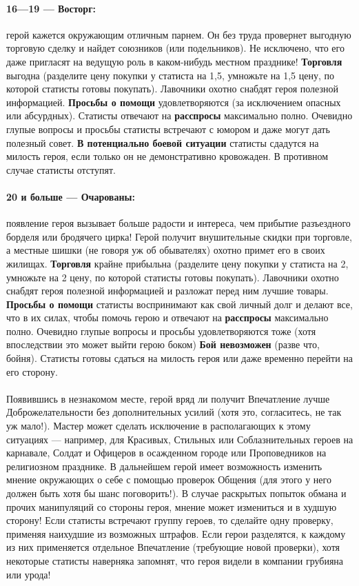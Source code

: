 \paragraph{16—19 — Восторг:} герой кажется окружающим отличным парнем. Он без труда провернет выгодную торговую сделку и найдет союзников (или подельников). Не исключено, что его даже пригласят на ведущую роль в каком-нибудь местном празднике!
\textbf{Торговля} выгодна (разделите цену покупки у статиста на 1,5, умножьте на 1,5 цену, по которой статисты готовы покупать). Лавочники охотно снабдят героя полезной информацией.
\textbf{Просьбы о помощи} удовлетворяются (за исключением опасных или абсурдных). Статисты отвечают на \textbf{расспросы} максимально полно. Очевидно глупые вопросы и просьбы статисты встречают с юмором и даже могут дать полезный совет.
\textbf{В потенциально боевой ситуации} статисты сдадутся на милость героя, если только он не демонстративно кровожаден. В противном случае статисты отступят.
\paragraph{20 и больше — Очарованы:} появление героя вызывает больше радости и интереса, чем прибытие разъездного борделя или бродячего цирка! Герой получит внушительные скидки при торговле, а местные шишки (не говоря уж об обывателях) охотно примет его в своих жилищах.
\textbf{Торговля} крайне прибыльна (разделите цену покупки у статиста на 2, умножьте на 2 цену, по которой статисты готовы покупать). Лавочники охотно снабдят героя полезной информацией и разложат перед ним лучшие товары.
\textbf{Просьбы о помощи} статисты воспринимают как свой личный долг и делают все, что в их силах, чтобы помочь герою и отвечают на \textbf{расспросы} максимально полно. Очевидно глупые вопросы и просьбы удовлетворяются тоже (хотя впоследствии это может выйти герою боком)
\textbf{Бой невозможен} (разве что, бойня). Статисты готовы сдаться на милость героя или даже временно перейти на его сторону.
\paragraph{}
Появившись в незнакомом месте, герой вряд ли получит Впечатление лучше Доброжелательности без дополнительных усилий (хотя это, согласитесь, не так уж мало!). Мастер может сделать исключение в располагающих к этому ситуациях — например, для Красивых, Стильных или Соблазнительных героев на карнавале, Солдат и Офицеров в осажденном городе или Проповедников на религиозном празднике.
\newline
В дальнейшем герой имеет возможность изменить мнение окружающих о себе с помощью проверок Общения (для этого у него должен быть хотя бы шанс поговорить!). В случае раскрытых попыток обмана и прочих манипуляций со стороны героя, мнение может измениться и в худшую сторону!
\newline
Если статисты встречают группу героев, то сделайте одну проверку, применяя наихудшие из возможных штрафов. Если герои разделятся, к каждому из них применяется отдельное Впечатление (требующие новой проверки), хотя некоторые статисты наверняка запомнят, что героя видели в компании грубияна или урода!
